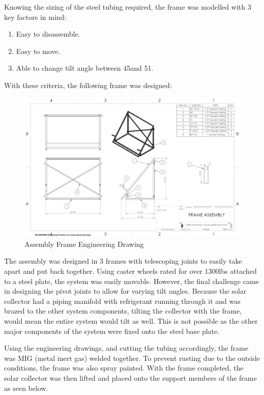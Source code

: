 \medskip
Knowing the sizing of the steel tubing required, the frame was modelled with 3 key factors in mind:

\medskip
\begin{enumerate}[itemsep=3mm, parsep=-1mm, label=\roman*.]
    \item Easy to disassemble.
    \item Easy to move.
    \item Able to change tilt angle between 45\textdegree and 51\textdegree.
\end{enumerate}

With these criteria, the following frame was designed:

\begin{figure}[H]
    \centering
    \includegraphics[width=\textwidth]{images/frame_drawing.PNG}
    \caption{Assembly Frame Engineering Drawing}
\end{figure}

\medskip
The assembly was designed in 3 frames with telescoping joints to easily take apart and put back together. Using caster wheels rated for over 1300lbs attached to a steel plate, the system was easily movable. However, the final challenge came in designing the pivot joints to allow for varying tilt angles. Because the solar collector had a piping manifold with refrigerant running through it and was brazed to the other system components, tilting the collector with the frame, would mean the entire system would tilt as well. This is not possible as the other major components of the system were fixed onto the steel base plate.

\medskip
Using the engineering drawings, and cutting the tubing accordingly, the frame was MIG (metal inert gas) welded together. To prevent rusting due to the outside conditions, the frame was also spray painted. With the frame completed, the solar collector was then lifted and placed onto the support members of the frame as seen below.

